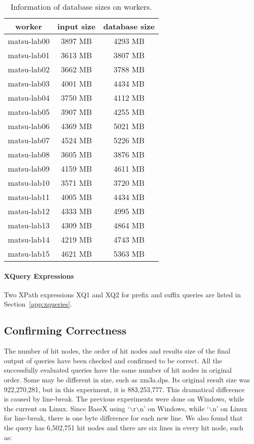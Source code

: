 \begin{table}
	\centering
	\label{tab:dbinfo}
	\caption{Information of database sizes on workers.}
	\begin{tabular}{c|c|c}
		\hline
		worker &  input size & database size \\
		\hline
		matsu-lab00 & 3897 MB & 4293 MB \\
		matsu-lab01 & 3613 MB & 3807 MB \\
		matsu-lab02 & 3662 MB & 3788 MB \\
		matsu-lab03 & 4001 MB & 4434 MB \\
		matsu-lab04 & 3750 MB & 4112 MB \\
		matsu-lab05 & 3907 MB & 4255 MB \\
		matsu-lab06 & 4369 MB & 5021 MB \\
		matsu-lab07 & 4524 MB & 5226 MB \\
		matsu-lab08 & 3605 MB & 3876 MB \\
		matsu-lab09 & 4159 MB & 4611 MB \\
		matsu-lab10 & 3571 MB & 3720 MB \\
		matsu-lab11 & 4005 MB & 4434 MB \\
		matsu-lab12 & 4333 MB & 4995 MB \\
		matsu-lab13 & 4309 MB & 4864 MB \\
		matsu-lab14 & 4219 MB & 4743 MB \\
		matsu-lab15 & 4621 MB & 5363 MB \\
		\hline
	\end{tabular}
\end{table}




\paragraph{XQuery Expressions}

Two XPath expressions XQ1 and XQ2 for prefix and suffix queries
are listed in Section~\ref{app:xqueries}.



\subsection{Confirming Correctness}

The number of hit nodes, the order of hit nodes and results size of
the final output of queries have been checked and confirmed to be correct.
All the successfully evaluated queries
have the same number of hit nodes in original order. Some may be
different in size, such as xm3a.dps. Its original result size
was 922,270,281, but in this experiment, it is 883,253,777.
This dramatical difference is caused by line-break. The previous
experiments were done on Windows, while the current on Linux.
Since BaseX using `$\backslash$r$\backslash$n' on Windows, while
`$\backslash$n' on Linux for line-break, there is one byte
difference for each new line. We also found that the query has
6,502,751 hit nodes and  there are six lines in every hit node,
such as:\\

